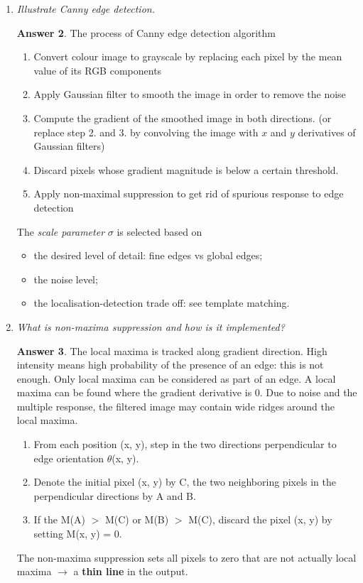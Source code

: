 \documentclass[a4paper,12 pt]{article}
\theoremstyle{definition}
\theoremstyle{remark}
\theoremstyle{definition}
\theoremstyle{definition}
\theoremstyle{definition}
\theoremstyle{definition}
\theoremstyle{remark}
\theoremstyle{remark}
\theoremstyle{definition}
\theoremstyle{definition}
\newtheorem*{answer}{Answer}
\begin{document}
\begin{enumerate}
\begin{answer}
\begin{itemize}
\item Highlights high frequency components.
\end{itemize}
\end{answer}
\item \textit{Illustrate Canny edge detection.}
\begin{answer}
The process of Canny edge detection algorithm
\begin{enumerate}
\item Convert colour image to grayscale by replacing each pixel by the mean value of its RGB components
\item Apply Gaussian filter to smooth the image in order to remove the noise
\item Compute the gradient of the smoothed image in both directions.  
(or replace step 2. and 3. by convolving the image with $x$ and $y$ derivatives of Gaussian filters)
\item Discard pixels whose gradient magnitude is below a certain threshold.
\item Apply non-maximal suppression to get rid of spurious response to edge detection
\end{enumerate}
The \textit{scale parameter} $\sigma$ is selected based on
\begin{itemize}
\item the desired level of detail: fine edges vs global edges;
\item the noise level;
\item the localisation-detection trade off: see template matching.
 \end{itemize}
\end{answer}
\item \textit{What is non-maxima suppression and how is it implemented?}
\begin{answer}
The local maxima is tracked along gradient direction. High intensity means high probability of the presence of an edge: this is not enough. Only local maxima can be considered as part of an edge. A local maxima can be found where the gradient derivative is 0. Due to noise and the multiple response, the filtered image may contain wide ridges around the local maxima. 
\begin{enumerate}
\item From each position (x, y), step in the two directions perpendicular to edge orientation $\theta$(x, y).
\item Denote the initial pixel (x, y) by C, the two neighboring pixels in the
perpendicular directions by A and B.
\item  If the M(A) $>$ M(C) or M(B) $>$ M(C), discard the pixel (x, y) by setting M(x, y) = 0.
\end{enumerate}
The non-maxima suppression sets all pixels to zero that are not actually local maxima $\rightarrow$  a \textbf{thin line} in the output. 
\end{answer}
\end{enumerate}
\newpage
\end{document}
